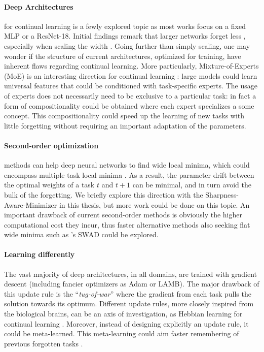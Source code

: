 \paragraph{Deep Architectures} for continual learning is a fewly explored topic as most works focus
on a fixed MLP or a ResNet-18. Initial findings remark that larger networks forget less
\citep{ramasesh2022scalecontinual}, especially when scaling the width
\citep{mirzadeh2022widecontinualnetworks}. Going further than simply scaling, one may wonder if the
structure of current architectures, optimized for \iid training, have inherent flaws regarding
continual learning. More particularly, Mixture-of-Experts (MoE) is an interesting direction for
continual learning \citep{caccia2022anytimelearning}: large models could learn universal features
that could be conditioned with task-specific experts. The usage of experts does not necessarily need
to be exclusive to a particular task: in fact a form of compositionality could be obtained where
each expert specializes a some concept. This compositionality could speed up the learning of new
tasks with little forgetting without requiring an important adaptation of the parameters.

\paragraph{Second-order optimization} methods can help deep neural networks to find wide local
minima, which could encompass multiple task local minima \citep{lee2020kroneckercontinual}. As a
result, the parameter drift between the optimal weights of a task $t$ and $t+1$ can be minimal, and
in turn avoid the bulk of the forgetting. We briefly explore this direction with the
Sharpness-Aware-Minimizer \citep{foret2020sam} in this thesis, but more work could be done on this
topic. An important drawback of current second-order methods is obviously the higher computational
cost they incur, thus faster alternative methods also seeking flat wide minima such as
\citet{cha2021swad}'s SWAD could be explored.

\paragraph{Learning differently} The vast majority of deep architectures, in all domains, are
trained with gradient descent (including fancier optimizers as Adam or LAMB). The major drawback of
this update rule is the ``\textit{tug-of-war}'' \citep{hadsell2020embracingchange} where the
gradient from each task pulls the solution towards its optimum. Different update rules, more closely
inspired from the biological brains, can be an axis of investigation, as Hebbian learning for
continual learning \citep{taylor2020hebbiancontinual}. Moreover, instead of designing explicitly an
update rule, it could be meta-learned. This meta-learning could aim faster remembering of previous
forgotten tasks \citep{he2019metacontinual,caccia2020osaka}.


